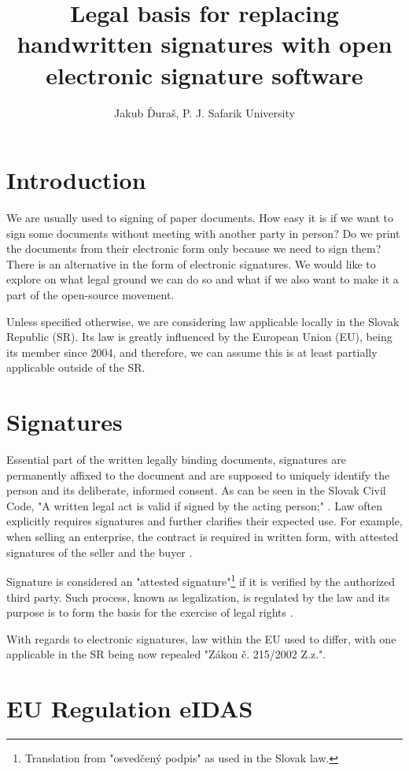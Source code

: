 \documentclass[a4paper,twocolumn]{article}
\title{Legal basis for replacing handwritten signatures with open electronic signature software}
\author{Jakub Ďuraš, P. J. Safarik University}
\begin{document}
{
    \maketitle
}

\section*{Introduction}

We are usually used to signing of paper documents.
How easy it is if we want to sign some documents without meeting with another party in person?
Do we print the documents from their electronic form only because we need to sign them? There is an alternative in the form of electronic signatures.
We would like to explore on what legal ground we can do so and what if we also want to make it a part of the open-source movement.

Unless specified otherwise, we are considering law applicable locally in the Slovak Republic (SR).
Its law is greatly influenced by the European Union (EU), being its member since 2004, and therefore, we can assume this is at least partially applicable outside of the SR.

\section{Signatures}

Essential part of the written legally binding documents, signatures are permanently affixed to the document and are supposed to uniquely identify the person and its deliberate, informed consent.
As can be seen in the Slovak Civil Code, "A written legal act is valid if signed by the acting person;" \cite{1}.
Law often explicitly requires signatures and further clarifies their expected use.
For example, when selling an enterprise, the contract is required in written form, with attested signatures of the seller and the buyer \cite{2}.

Signature is considered an "attested signature"\footnote{Translation from "osvedčený podpis" as used in the Slovak law.} if it is verified by the authorized third party.
Such process, known as legalization, is regulated by the law and its purpose is to form the basis for the exercise of legal rights \cite{3}.

With regards to electronic signatures, law within the EU used to differ, with one applicable in the SR being now repealed "Zákon č. 215/2002 Z.z.".

\section{EU Regulation eIDAS}
\end{document}
